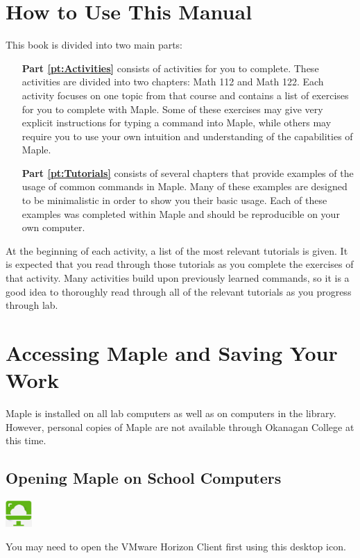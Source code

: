 \section{How to Use This Manual}
\label{how_to_use_this_manual}

This book is divided into two main parts:
\begin{itemize}
\item[\textbf{Part \ref{pt:Activities}}] consists of activities for you to complete. These activities are divided into two chapters: Math 112 and Math 122. Each activity focuses on one topic from that course and contains a list of exercises for you to complete with Maple. Some of these exercises may give very explicit instructions for typing a command into Maple, while others may require you to use your own intuition and understanding of the capabilities of Maple.
\item[\textbf{Part \ref{pt:Tutorials}}] consists of several chapters that provide examples of the usage of common commands in Maple. Many of these examples are designed to be minimalistic in order to show you their basic usage. Each of these examples was completed within Maple and should be reproducible on your own computer.
\end{itemize}
At the beginning of each activity, a list of the most relevant tutorials is given. It is expected that you read through those tutorials as you complete the exercises of that activity. Many activities build upon previously learned commands, so it is a good idea to thoroughly read through all of the relevant tutorials as you progress through lab.

\section{Accessing Maple and Saving Your Work}
\label{sec:accessing_maple}

Maple is installed on all lab computers as well as on computers in the library. However, personal copies of Maple are not available through Okanagan College at this time.

\subsection*{Opening Maple on School Computers}

\begin{marginfigure}
\centering
\includegraphics[width=1cm]{introduction/figures/horizonvmware.png}
\caption{You may need to open the VMware Horizon Client first using this desktop icon.}
\end{marginfigure}


